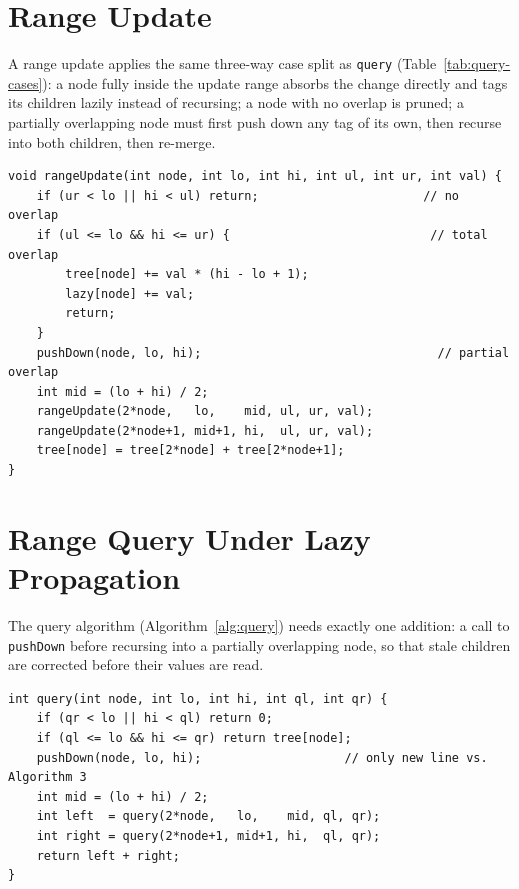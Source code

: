 \documentclass[
  11pt,
  a4paper,
  twoside=false,
  numbers=noenddot,
  headings=big,
  parskip=half,
  toc=bibliography,
  toc=listof,
  bibliography=totoc
]{scrreprt}
\begin{document}
\section{Range Update}
A range update applies the same three-way case split as \texttt{query} (Table~\ref{tab:query-cases}): a node fully inside the update range absorbs the change directly and tags its children lazily instead of recursing; a node with no overlap is pruned; a partially overlapping node must first push down any tag of its own, then recurse into both children, then re-merge.

\begin{lstlisting}[style=cpp, caption={Range update with lazy propagation (add val to every element in the update interval).}, label={alg:rangeupdate}]
void rangeUpdate(int node, int lo, int hi, int ul, int ur, int val) {
    if (ur < lo || hi < ul) return;                       // no overlap
    if (ul <= lo && hi <= ur) {                            // total overlap
        tree[node] += val * (hi - lo + 1);
        lazy[node] += val;
        return;
    }
    pushDown(node, lo, hi);                                 // partial overlap
    int mid = (lo + hi) / 2;
    rangeUpdate(2*node,   lo,    mid, ul, ur, val);
    rangeUpdate(2*node+1, mid+1, hi,  ul, ur, val);
    tree[node] = tree[2*node] + tree[2*node+1];
}
\end{lstlisting}

\section{Range Query Under Lazy Propagation}
The query algorithm (Algorithm~\ref{alg:query}) needs exactly one addition: a call to \texttt{pushDown} before recursing into a partially overlapping node, so that stale children are corrected before their values are read.

\begin{lstlisting}[style=cpp, caption={Range query, adapted for a tree with lazy tags.}, label={alg:lazyquery}]
int query(int node, int lo, int hi, int ql, int qr) {
    if (qr < lo || hi < ql) return 0;
    if (ql <= lo && hi <= qr) return tree[node];
    pushDown(node, lo, hi);                    // only new line vs. Algorithm 3
    int mid = (lo + hi) / 2;
    int left  = query(2*node,   lo,    mid, ql, qr);
    int right = query(2*node+1, mid+1, hi,  ql, qr);
    return left + right;
}
\end{lstlisting}
\end{document}
